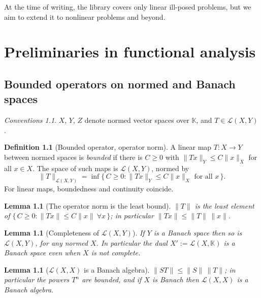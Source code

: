 \documentclass[a4paper]{report}
\theoremstyle{plain}
\newtheorem{lemma}[theorem]{Lemma}
\theoremstyle{definition}
\newtheorem{definition}[theorem]{Definition}
\theoremstyle{remark}
\newtheorem{assumptions}[theorem]{Conventions}
\begin{document}
At the time of writing, the library covers only linear ill-posed problems, but we aim to extend it to nonlinear problems and beyond.

\tableofcontents
\part{Preliminaries in functional analysis}
\label{part_1_funcanal}
\chapter{Bounded operators on normed and Banach spaces}
\label{ch_01_bounded_operators}

\begin{assumptions}
  \label{asm_bounded_operators_normed}
  $X$, $Y$, $Z$ denote normed vector spaces over
$\mathbb{K}$, and $T \in \mathcal{L}(X,Y)$.
\end{assumptions}

\begin{definition}[Bounded operator, operator norm]
  \label{def_clm}
  A linear map $T \colon X \to Y$ between normed spaces is \emph{bounded} if there is
  $C \ge 0$ with $\|Tx\|_Y \le C\|x\|_X$ for all $x \in X$.  The space of such maps is
  $\mathcal{L}(X,Y)$, normed by
  \[
    \|T\|_{\mathcal{L}(X,Y)} = \inf\{\, C \ge 0 : \|Tx\|_Y \le C\|x\|_X \text{ for all } x \,\}.
  \]
  For linear maps, boundedness and continuity coincide.
\end{definition}


\begin{lemma}[The operator norm is the least bound]
  \label{lem_isleast_opnorm}
  $\|T\|$ is the least element of $\{\,C \ge 0 : \|Tx\| \le C\|x\| \ \forall x\,\}$; in
  particular $\|Tx\| \le \|T\|\,\|x\|$.
\end{lemma}


\begin{lemma}[Completeness of $\mathcal{L}(X,Y)$]
  \label{lem_clm_complete}
  If $Y$ is a Banach space then so is $\mathcal{L}(X,Y)$, for any normed $X$.  In
  particular the dual $X' := \mathcal{L}(X,\mathbb{K})$ is a Banach space even when $X$ is
  not complete.
\end{lemma}




\begin{lemma}[$\mathcal{L}(X,X)$ is a Banach algebra]
  \label{lem_banach_algebra}
  $\|ST\| \le \|S\|\,\|T\|$; in particular the powers $T^n$ are bounded, and if $X$ is
  Banach then $\mathcal{L}(X,X)$ is a Banach algebra.
\end{lemma}
\end{document}
